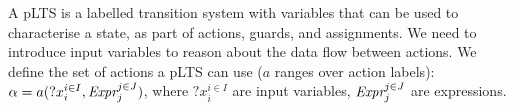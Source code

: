 \documentclass{llncs}
\begin{document}
A pLTS is a labelled transition system with variables that can be
used to characterise a state, as part of actions, guards, and
assignments. 
We need to introduce input variables to reason about the data flow between actions.
We  define the set of actions a pLTS can use ($a$
ranges over action labels):\\
$\alpha=a(?x_i^{i \in I}, 
\Expr_j^{j \in J})$, where $?x_i^{i \in I}$ are input variables, $\Expr_j^{j \in J}$ 
are expressions.
\end{document}
